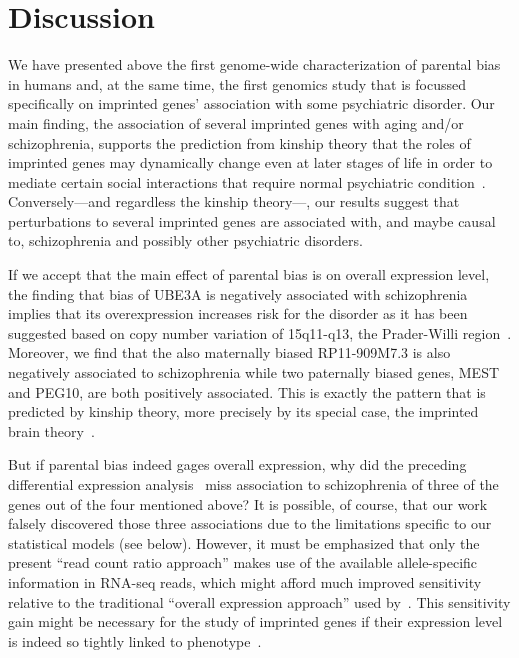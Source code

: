 \documentclass[letterpaper]{article}
\begin{document}
\section{Discussion}

We have presented above the first genome-wide characterization of parental
bias in humans and, at the same time, the first genomics study that is
focussed specifically on imprinted genes' association with some psychiatric
disorder.  Our main finding, the association of several imprinted genes with aging
and/or schizophrenia, supports the prediction from kinship theory that the
roles of imprinted genes may dynamically change even at later stages of life
in order to mediate certain social interactions that require normal
psychiatric condition~\cite{Ubeda2012,Wilkins2003}.  Conversely---and regardless
the kinship theory---, our results suggest that perturbations to several
imprinted genes are associated with, and maybe causal to, schizophrenia and
possibly other psychiatric disorders.

If we accept that the main effect of parental bias is on overall expression
level, the finding that bias of UBE3A is negatively associated with
schizophrenia implies that its overexpression increases risk for the disorder
as it has been suggested based on copy number variation of 15q11-q13, the
Prader-Willi region~\cite{McNamara2013}.  Moreover, we find that the also
maternally biased RP11-909M7.3 is also negatively associated to schizophrenia
while two paternally biased genes, MEST and PEG10, are both positively
associated.  This is exactly the pattern that is predicted by kinship theory,
more precisely by its special case, the imprinted brain
theory~\cite{Crespi2008a}.

But if parental bias indeed gages overall expression, why did the
preceding differential expression analysis~\cite{Fromer2016a} miss association
to schizophrenia of three of the genes out of the four mentioned above?  It is
possible, of course, that our work falsely discovered those three associations
due to the limitations specific to our statistical models (see below).
However, it must be emphasized that only the present ``read count ratio
approach'' makes use of the available allele-specific information in RNA-seq
reads, which might afford much improved sensitivity relative to the
traditional ``overall expression approach'' used by~\cite{Fromer2016a}.  This
sensitivity gain might be necessary for the study of imprinted genes if their
expression level is indeed so tightly linked to phenotype~\cite{McNamara2013}.
\end{document}
